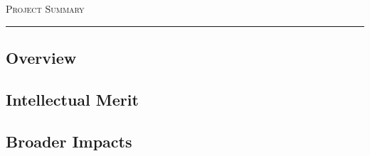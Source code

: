 




\begin{center}
{\LARGE \textsc{Project Summary}}
\end{center}
\hrule

\vspace{3mm}

\subsection*{Overview}  

\subsection*{Intellectual Merit}

\subsection*{Broader Impacts}




